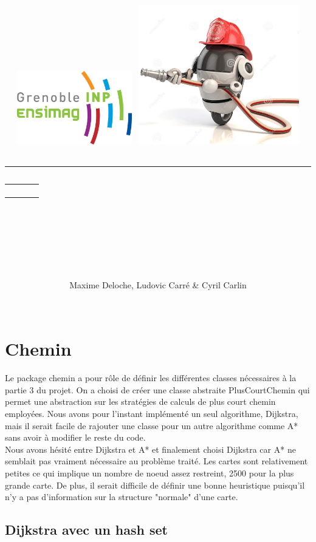 \documentclass[12pt,a4paper]{article}
\title{
	\begin{flushleft}
		\includegraphics[width=5cm]{rapport/logo_ensimag.jpg} \hfill
		\includegraphics[width=7cm]{rapport/firebot.jpg} \\[40pt]
	\end{flushleft} 
	{\rule{15cm}{1mm}}\vspace{7mm}
	\begin{tabular}{p{4cm} r}
		& {\Huge {\bf \typedeprojet}} \\[20pt]
		& {\huge \nomduprojet}
	\end{tabular}\\
	\vspace{7mm}{\rule{15cm}{1mm}}\vspace{2mm} \\
	\hfill \large \dateduprojet \hspace{2cm}
	\renewcommand{\contentsname}{\LARGE \it Sommaire \hfill} %
	\setcounter{tocdepth}{2} %
	\tableofcontents
	\vfill
}
\author{
	\begin{tabular}{p{15cm}}
		\Large Maxime Deloche, Ludovic Carré \& Cyril Carlin
	\end{tabular} \\
	\hline
}
\date{}
\begin{document}
\maketitle
\thispagestyle{empty} %
\newpage


\section{Chemin}

Le package chemin a pour rôle de définir les différentes classes nécessaires à la partie 3 du projet. On a choisi de créer une classe abstraite PlusCourtChemin qui permet une abstraction sur les stratégies de calculs de plus court chemin employées. Nous avons pour l'instant implémenté un seul algorithme, Dijkstra, mais il serait facile de rajouter une classe pour un autre algorithme comme A* sans avoir à modifier le reste du code.\\

Nous avons hésité entre Dijkstra et A* et finalement choisi Dijkstra car A* ne semblait pas vraiment nécessaire au problème traité. Les cartes sont relativement petites ce qui implique un nombre de noeud assez restreint, 2500 pour la plus grande carte. De plus, il serait difficile de définir une bonne heuristique puisqu'il n'y a pas d'information sur la structure "normale" d'une carte.

\subsection{Dijkstra avec un hash set}
\end{document}
